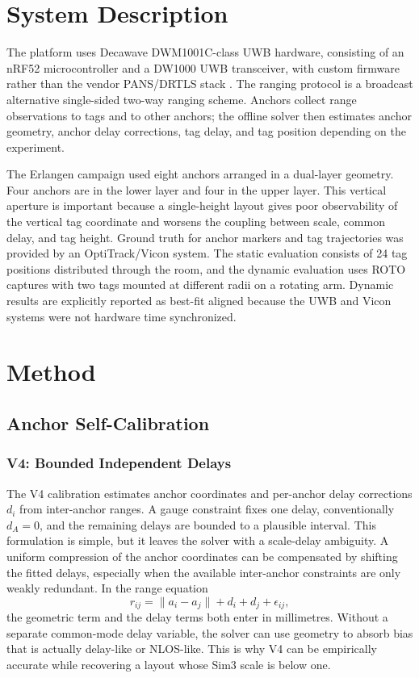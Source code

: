 \section{System Description}
The platform uses Decawave DWM1001C-class UWB hardware, consisting of an nRF52 microcontroller and a DW1000 UWB transceiver, with custom firmware rather than the vendor PANS/DRTLS stack \cite{dw1000_datasheet,decawave_appnotes}. The ranging protocol is a broadcast alternative single-sided two-way ranging scheme. Anchors collect range observations to tags and to other anchors; the offline solver then estimates anchor geometry, anchor delay corrections, tag delay, and tag position depending on the experiment.

The Erlangen campaign used eight anchors arranged in a dual-layer geometry. Four anchors are in the lower layer and four in the upper layer. This vertical aperture is important because a single-height layout gives poor observability of the vertical tag coordinate and worsens the coupling between scale, common delay, and tag height. Ground truth for anchor markers and tag trajectories was provided by an OptiTrack/Vicon system. The static evaluation consists of 24 tag positions distributed through the room, and the dynamic evaluation uses ROTO captures with two tags mounted at different radii on a rotating arm. Dynamic results are explicitly reported as best-fit aligned because the UWB and Vicon systems were not hardware time synchronized.

\section{Method}
\subsection{Anchor Self-Calibration}
\subsubsection{V4: Bounded Independent Delays}
The V4 calibration estimates anchor coordinates and per-anchor delay corrections \(d_i\) from inter-anchor ranges. A gauge constraint fixes one delay, conventionally \(d_A=0\), and the remaining delays are bounded to a plausible interval. This formulation is simple, but it leaves the solver with a scale-delay ambiguity. A uniform compression of the anchor coordinates can be compensated by shifting the fitted delays, especially when the available inter-anchor constraints are only weakly redundant. In the range equation
\[
  r_{ij} = \|a_i-a_j\| + d_i + d_j + \epsilon_{ij},
\]
the geometric term and the delay terms both enter in millimetres. Without a separate common-mode delay variable, the solver can use geometry to absorb bias that is actually delay-like or NLOS-like. This is why V4 can be empirically accurate while recovering a layout whose Sim3 scale is below one.

